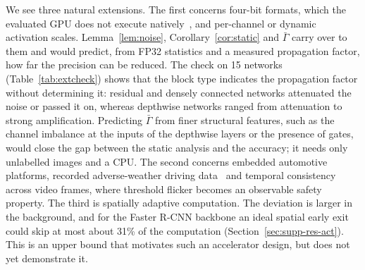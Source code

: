 \documentclass[pdflatex,sn-mathphys-num]{sn-jnl}%
\theoremstyle{thmstyleone}%
\theoremstyle{thmstyletwo}%
\theoremstyle{thmstylethree}%
\begin{document}
We see three natural extensions. The first concerns four-bit formats, which the evaluated GPU does not execute natively~\cite{rouhani2023microscaling}, and per-channel or dynamic activation scales. Lemma~\ref{lem:noise}, Corollary~\ref{cor:static} and $\bar\Gamma$ carry over to them and would predict, from FP32 statistics and a measured propagation factor, how far the precision can be reduced. The check on 15 networks (Table~\ref{tab:extcheck}) shows that the block type indicates the propagation factor without determining it: residual and densely connected networks attenuated the noise or passed it on, whereas depthwise networks ranged from attenuation to strong amplification. Predicting $\bar\Gamma$ from finer structural features, such as the channel imbalance at the inputs of the depthwise layers or the presence of gates, would close the gap between the static analysis and the accuracy; it needs only unlabelled images and a CPU. The second concerns embedded automotive platforms, recorded adverse-weather driving data~\cite{zhang2023adverse} and temporal consistency across video frames, where threshold flicker becomes an observable safety property. The third is spatially adaptive computation. The deviation is larger in the background, and for the Faster R-CNN backbone an ideal spatial early exit could skip at most about 31\% of the computation (Section~\ref{sec:supp-res-act}). This is an upper bound that motivates such an accelerator design, but does not yet demonstrate it.
\end{document}
